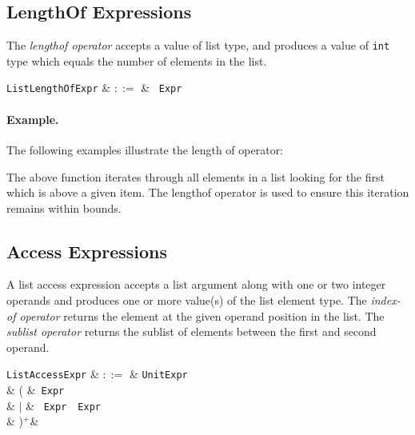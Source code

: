 
\subsection{LengthOf Expressions}
\label{c_expr_lengthof}

The {\em lengthof operator} accepts a value of list type, and produces a value of \lstinline{int} type which equals the number of elements in the list.

\begin{syntax}
\verb+ListLengthOfExpr+ & $::=$ & \token{|}\ \verb+Expr+\ \token{|}\\
\end{syntax}

\paragraph{Example.} The following examples illustrate the length of operator:



The above function iterates through all elements in a list looking for the first which is above a given item.  The lengthof operator is used to ensure this iteration remains within bounds.


\subsection{Access Expressions}
\label{c_expr_list_access}

A list access expression accepts a list argument along with one or two integer operands and produces one or more value(s) of the list element type.  The {\em index-of operator} returns the element at the given operand position in the list.  The {\em sublist operator} returns the sublist of elements between the first and second operand.

\begin{syntax}
  \verb+ListAccessExpr+ & $::=$ & \verb+UnitExpr+\\
   &  \big( &\token{[}\ \verb+Expr+\ \token{]}\\
   & $|$ & \token{[}\ \verb+Expr+\ \ \verb+Expr+\ \token{]}\\
   & \big)$^+$&\\
\end{syntax}

